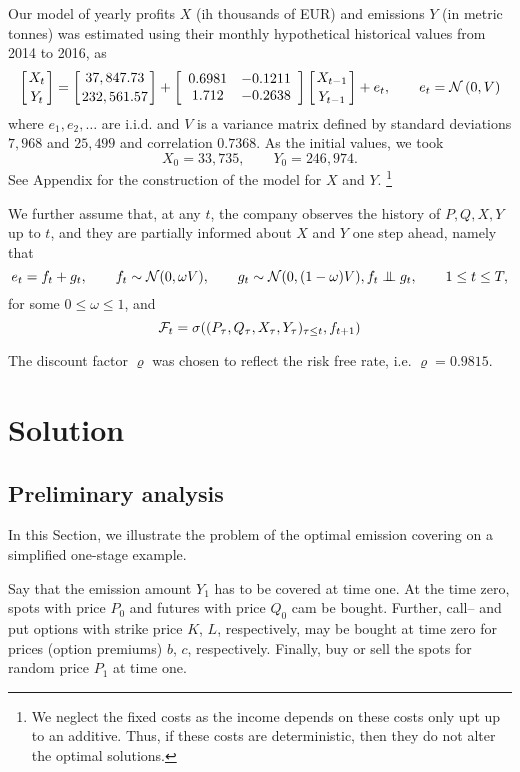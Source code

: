 \documentclass[3p,times]{elsarticle}
\begin{document}
Our model of yearly profits $X$ (ih thousands of EUR) and emissions $Y$ (in metric tonnes) was estimated using their monthly hypothetical historical values from 2014 to 2016, as 
\begin{equation}
\left[X_t
\atop
Y_t
\right]
=\left[37,847.73
\atop
232,561.57
\right]+
\left[
\begin{array}{cc}
0.6981 & -0.1211 \\
1.712 & -0.2638
\end{array}
\right]
\left[X_{t-1}
\atop
Y_{t-1}
\right]
 + e_t,\qquad e_t = \mathcal{N}\left(0,V\right)  
\end{equation}
where $e_1,e_2,\dots$ are i.i.d. and $V$ is a variance matrix defined by standard deviations $7,968$ and $25,499$ and correlation $0.7368$. As the initial values, we took
$$
X_0 = 33,735,\qquad Y_0 = 246,974.
$$
See Appendix for the construction of the model for $X$ and $Y$. \footnote{We neglect the fixed costs as the income depends on these costs only upt up to an additive. Thus, if these costs are deterministic, then they do not alter the optimal solutions.}



We further assume that, at any $t$, the company observes the history of $P,Q,X,Y$ up to $t$, and they are  partially informed about $X$ and $Y$ one step ahead, namely that 
$$
e_t = f_t+g_t, \qquad f_t \sim \mathcal{N}(0,\omega V), 
\qquad
g_t \sim \mathcal{N}(0,(1-\omega) V),f_t \indep g_t,\qquad 1 \leq t \leq T,
$$
for some $0\leq \omega \leq 1$, and
$$
\mathcal{F}_t = \sigma( (P_\tau,Q_\tau,X_\tau,Y_\tau)_{\tau \leq t}, f_{t+1} )
$$

The discount factor $\varrho$ was chosen to reflect the risk free rate, i.e. $\varrho=0.9815$.
		
\section{Solution}

\subsection*{Preliminary analysis}

In this Section, we illustrate the problem of the optimal emission covering on a simplified one-stage example. 

Say that the emission amount $Y_1$ has to be covered at time one. At the time zero, spots with price $P_0$ and futures with price $Q_0$ cam be bought.  Further, call-- and put options with strike price $K$, $L$, respectively, may be bought at time zero for prices (option premiums) $b$, $c$, respectively. Finally, buy or sell the spots for random price $P_1$ at time one.
\end{document}
